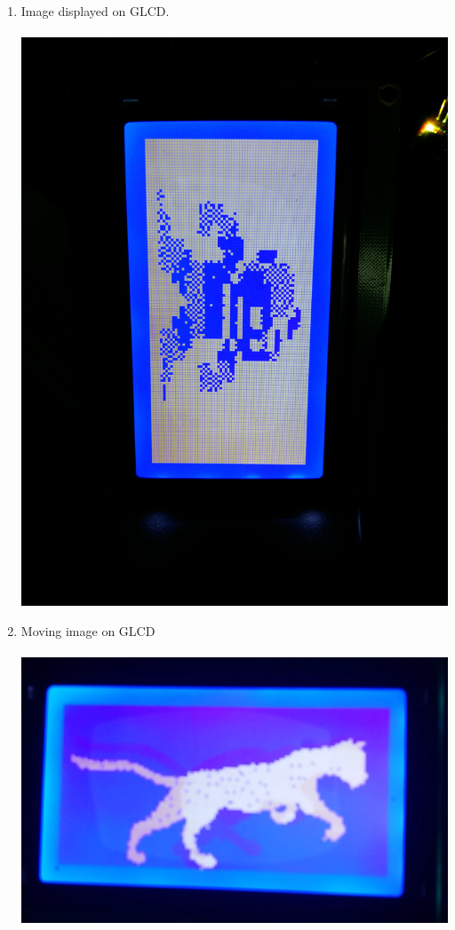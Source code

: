 \documentclass[a4paper,12pt,oneside]{book}
\begin{document}
\begin{enumerate}
\item Image displayed on GLCD.\\~\\
\includegraphics[scale=0.07]{20160706_152740.jpg}
\newpage
\item Moving image on GLCD\\~\\
\includegraphics[scale = 0.525]{moving.PNG}

\end{enumerate}
\end{document}
